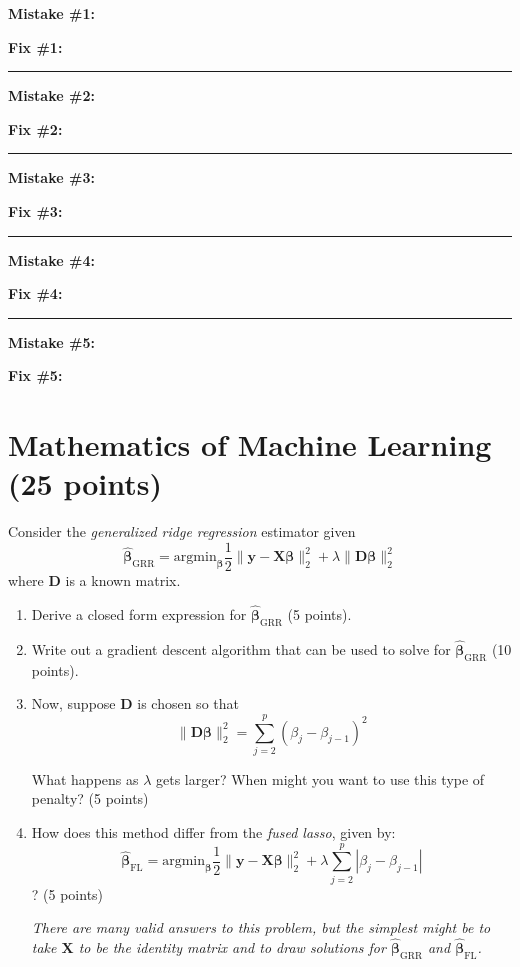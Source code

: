 \documentclass[12pt]{article}
\newcommand{\bX}{\bm{X}}
\newcommand{\by}{\bm{y}}
\newcommand{\bbeta}{\bm{\beta}}
\newcommand{\bD}{\bm{D}}
\begin{document}
\clearpage 

\textbf{Mistake \#1: }

\vfill 

\textbf{Fix \#1: }

\vfill 
\hrule 


\textbf{Mistake \#2: }

\vfill 

\textbf{Fix \#2: }

\vfill 

\hrule 

\textbf{Mistake \#3: }

\vfill 

\textbf{Fix \#3: }

\vfill 

\hrule


\textbf{Mistake \#4: }

\vfill 

\textbf{Fix \#4: }

\vfill 

\hrule 

\textbf{Mistake \#5: }

\vfill 

\textbf{Fix \#5: }

\vfill 

\clearpage
\section*{Mathematics of Machine Learning (25 points)}

Consider the \emph{generalized ridge regression} estimator given
\[\hat{\bbeta}_{\text{GRR}} = \text{argmin}_{\bbeta} \frac{1}{2}\|\by - \bX\bbeta\|_2^2 + \lambda \|\bD\bbeta\|_2^2\]
where $\bD$ is a known matrix. 
\begin{enumerate}[label={Q\arabic*.)}]
\item Derive a closed form expression for $\hat{\bbeta}_{\text{GRR}}$ (5 points).

\vspace{3in}
\item Write out a gradient descent algorithm that can be used to solve for $\hat{\bbeta}_{\text{GRR}}$ (10 points).


\vspace{6in}
\item Now, suppose $\bD$ is chosen so that 
\[\|\bD\bbeta\|^2_2 = \sum_{j=2}^p (\beta_j - \beta_{j-1})^2\]

What happens as $\lambda$ gets larger? When might you want to use this type of penalty? (5 points)

\vspace{3in}
\item How does this method differ from the \emph{fused lasso}, given by: 
\[\hat{\bbeta}_{\text{FL}} = \text{argmin}_{\bbeta} \frac{1}{2}\|\by - \bX\bbeta\|_2^2 + \lambda \sum_{j=2}^p |\beta_j - \beta_{j-1}|\]
? (5 points)

{\small \it There are many valid answers to this problem, but the simplest might be to take $\bX$ to be the identity matrix and to draw solutions for $\hat{\bbeta}_{\text{GRR}}$ and $\hat{\bbeta}_{\text{FL}}$.}

\end{enumerate}
\end{document}
